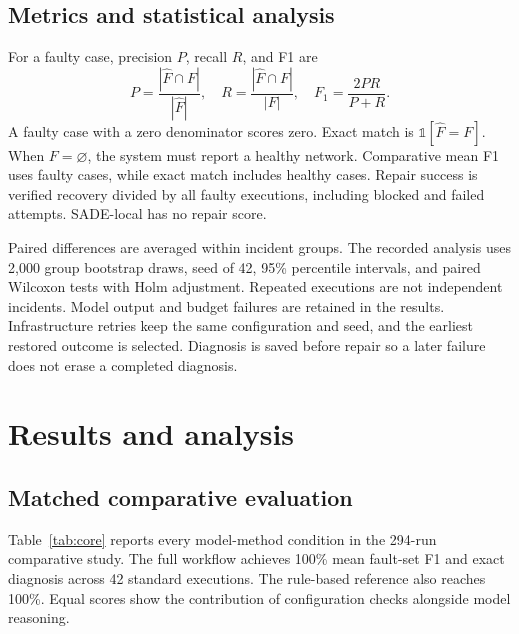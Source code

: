 \documentclass[pdflatex,sn-mathphys-num,iicol]{sn-jnl}
\begin{document}
\subsection{Metrics and statistical analysis}
For a faulty case, precision $P$, recall $R$, and F1 are
\begin{equation}
P=\frac{|\widehat F\cap F|}{|\widehat F|},\quad
R=\frac{|\widehat F\cap F|}{|F|},\quad
F_1=\frac{2PR}{P+R}.\label{eq:metrics}
\end{equation}
A faulty case with a zero denominator scores zero. Exact match is $\mathbb{1}[\widehat F=F]$. When $F=\varnothing$, the system must report a healthy network. Comparative mean F1 uses faulty cases, while exact match includes healthy cases. Repair success is verified recovery divided by all faulty executions, including blocked and failed attempts. SADE-local has no repair score.

Paired differences are averaged within incident groups. The recorded analysis uses 2,000 group bootstrap draws, seed of 42, 95\% percentile intervals, and paired Wilcoxon tests with Holm adjustment. Repeated executions are not independent incidents. Model output and budget failures are retained in the results. Infrastructure retries keep the same configuration and seed, and the earliest restored outcome is selected. Diagnosis is saved before repair so a later failure does not erase a completed diagnosis.

\section{Results and analysis}\label{sec:results}
\subsection{Matched comparative evaluation}
Table~\ref{tab:core} reports every model-method condition in the 294-run comparative study. The full workflow achieves 100\% mean fault-set F1 and exact diagnosis across 42 standard executions. The rule-based reference also reaches 100\%. Equal scores show the contribution of configuration checks alongside model reasoning.
\end{document}

